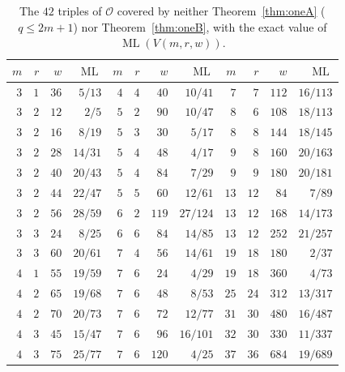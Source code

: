 \documentclass[11pt]{amsart}
\theoremstyle{plain}
\theoremstyle{definition}
\theoremstyle{remark}
\newcommand{\ML}{\operatorname{ML}}
\begin{document}
\begin{table}[h]
\centering\small
\begin{tabular}{rrrr@{\qquad}rrrr@{\qquad}rrrr}
\toprule
$m$ & $r$ & $w$ & $\ML$ & $m$ & $r$ & $w$ & $\ML$ & $m$ & $r$ & $w$ & $\ML$\\
\midrule
$3$ & $1$ & $36$ & $5/13$ & $4$ & $4$ & $40$ & $10/41$ & $7$ & $7$ & $112$ & $16/113$\\
$3$ & $2$ & $12$ & $2/5$ & $5$ & $2$ & $90$ & $10/47$ & $8$ & $6$ & $108$ & $18/113$\\
$3$ & $2$ & $16$ & $8/19$ & $5$ & $3$ & $30$ & $5/17$ & $8$ & $8$ & $144$ & $18/145$\\
$3$ & $2$ & $28$ & $14/31$ & $5$ & $4$ & $48$ & $4/17$ & $9$ & $8$ & $160$ & $20/163$\\
$3$ & $2$ & $40$ & $20/43$ & $5$ & $4$ & $84$ & $7/29$ & $9$ & $9$ & $180$ & $20/181$\\
$3$ & $2$ & $44$ & $22/47$ & $5$ & $5$ & $60$ & $12/61$ & $13$ & $12$ & $84$ & $7/89$\\
$3$ & $2$ & $56$ & $28/59$ & $6$ & $2$ & $119$ & $27/124$ & $13$ & $12$ & $168$ & $14/173$\\
$3$ & $3$ & $24$ & $8/25$ & $6$ & $6$ & $84$ & $14/85$ & $13$ & $12$ & $252$ & $21/257$\\
$3$ & $3$ & $60$ & $20/61$ & $7$ & $4$ & $56$ & $14/61$ & $19$ & $18$ & $180$ & $2/37$\\
$4$ & $1$ & $55$ & $19/59$ & $7$ & $6$ & $24$ & $4/29$ & $19$ & $18$ & $360$ & $4/73$\\
$4$ & $2$ & $65$ & $19/68$ & $7$ & $6$ & $48$ & $8/53$ & $25$ & $24$ & $312$ & $13/317$\\
$4$ & $2$ & $70$ & $20/73$ & $7$ & $6$ & $72$ & $12/77$ & $31$ & $30$ & $480$ & $16/487$\\
$4$ & $3$ & $45$ & $15/47$ & $7$ & $6$ & $96$ & $16/101$ & $32$ & $30$ & $330$ & $11/337$\\
$4$ & $3$ & $75$ & $25/77$ & $7$ & $6$ & $120$ & $4/25$ & $37$ & $36$ & $684$ & $19/689$\\
\bottomrule
\end{tabular}
\caption{The $42$ triples of $\mathcal O$ covered by neither Theorem~\ref{thm:oneA} ($q\le 2m+1$)
nor Theorem~\ref{thm:oneB}, with the exact value of $\ML(V(m,r,w))$.}\label{tab:uncov}
\end{table}



\end{document}
